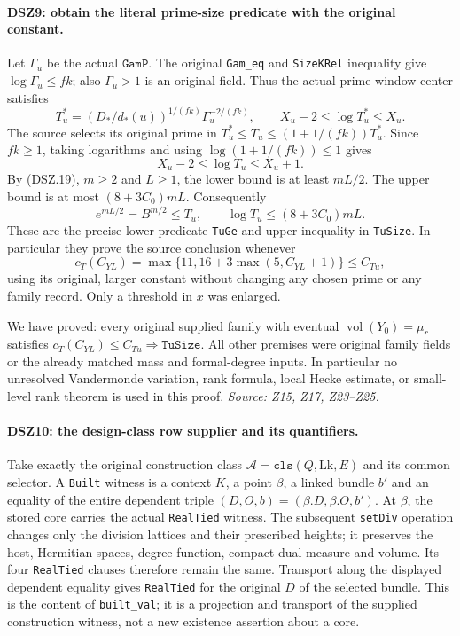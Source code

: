 \paragraph{DSZ9: obtain the literal prime-size predicate with the original constant.}
\label{claim:DSZ9}
Let $\Gamma_u$ be the actual $\texttt{GamP}$.
The original \texttt{Gam\_eq} and \texttt{SizeKRel} inequality
give $\log\Gamma_u\le fk$; also $\Gamma_u>1$ is an original
field. Thus the actual prime-window center satisfies
\[
 T_u^*=(D_*/d_*(u))^{1/(fk)}\Gamma_u^{-2/(fk)},\qquad
 X_u-2\le\log T_u^*\le X_u.                                  \tag{DSZ.20}
\]
The source selects its original prime in
$T_u^*\le T_u\le(1+1/(fk))T_u^*$.
Since $fk\ge1$, taking logarithms and using
$\log(1+1/(fk))\le1$ gives
\[
 X_u-2\le\log T_u\le X_u+1.
\]
By (DSZ.19), $m\ge2$ and $L\ge1$, the lower bound is at least
$mL/2$. The upper bound is at most $(8+3C_0)mL$.
Consequently
\[
 e^{mL/2}=B^{m/2}\le T_u,
 \qquad \log T_u\le(8+3C_0)mL.                               \tag{DSZ.21}
\]
These are the precise lower predicate \texttt{TuGe} and upper
inequality in \texttt{TuSize}. In particular they prove the
source conclusion whenever
\[
 c_T(C_{YL})=\max\{11,16+3\max(5,C_{YL}+1)\}\le C_{Tu},       \tag{DSZ.22}
\]
using its original, larger constant without changing any chosen
prime or any family record. Only a threshold in $x$ was enlarged.

We have proved: every original supplied family with eventual
$\operatorname{vol}(Y_0)=\mu_r$ satisfies
$c_T(C_{YL})\le C_{Tu}\Longrightarrow\texttt{TuSize}$.
All other premises were original family fields or the already
matched mass and formal-degree inputs. In particular no unresolved
Vandermonde variation, rank formula, local Hecke estimate, or
small-level rank theorem is used in this proof.
\emph{Source: Z15, Z17, Z23--Z25.}

\paragraph{DSZ10: the design-class row supplier and its quantifiers.}
\label{claim:DSZ10}
Take exactly the original construction class
$\mathcal A=\texttt{cls}(Q,\mathrm{Lk},E)$ and its common selector.
A \texttt{Built} witness is a context $K$, a point $\beta$, a
linked bundle $b'$ and an equality of the entire dependent triple
$(D,O,b)=(\beta.D,\beta.O,b')$.
At $\beta$, the stored core carries the actual
\texttt{RealTied} witness. The subsequent \texttt{setDiv} operation
changes only the division lattices and their prescribed heights;
it preserves the host, Hermitian spaces, degree function, compact-dual
measure and volume. Its four \texttt{RealTied} clauses therefore
remain the same. Transport along the displayed dependent equality
gives \texttt{RealTied} for the original $D$ of the selected bundle.
This is the content of \texttt{built\_val}; it is a projection and
transport of the supplied construction witness, not a new
existence assertion about a core.

